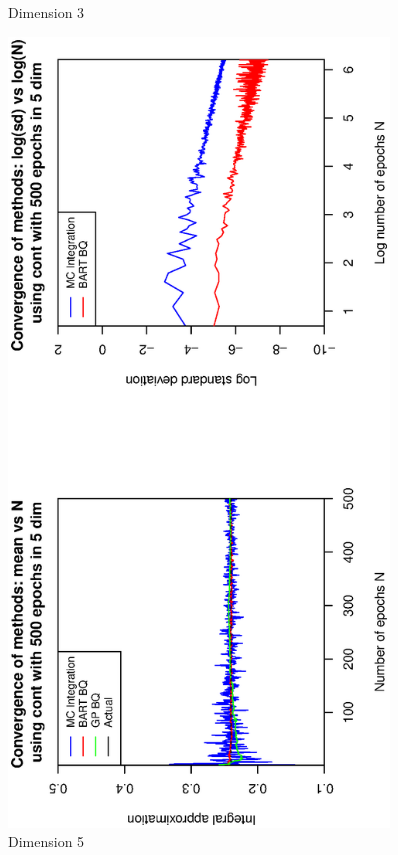 \begin{figure}[H]
\begin{minipage}[b]{0.4\textwidth}
     \vspace{-1.3cm}
     \caption{Dimension 3}
  \end{minipage}
    \hspace{1.5cm}
  \begin{minipage}[b]{0.4\textwidth}
    \includegraphics[width= 0.9\textwidth, angle = -90]{report/Figures/1/convergenceMean15Dimensions.eps}
     \vspace{-1.3cm}
    \caption{Dimension 5}
  \end{minipage}
\end{figure}
\vspace{-1.3cm}

